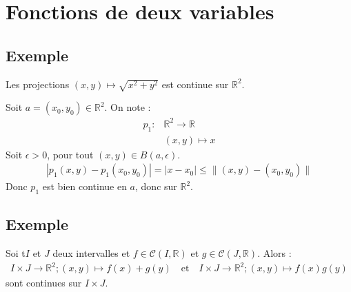 \documentclass[../main.tex]{subfiles}
\begin{document}
\setcounter{chapter}{35}
\chapter{Fonctions de deux variables}
\tableofcontents
\clearpage

\section{Exemple}
\begin{tcolorbox}[title=Exemple 36.15, title filled=false, colframe=darkgreen, colback=darkgreen!10!white]
    Les projections $(x, y)\mapsto \sqrt{x^2 + y^2}$ est continue sur $\mathbb{R}^2$. 
\end{tcolorbox}

\noindent Soit $a = (x_0, y_0)\in \mathbb{R}^2$. On note : 
\begin{align*}
    p_1:&\mathbb{R}^2\to \mathbb{R} \\
    &(x, y)\mapsto x
\end{align*}
Soit $\epsilon > 0$, pour tout $(x, y)\in B(a, \epsilon)$. 
\begin{align*}
    |p_1(x, y) - p_1(x_0, y_0)| = |x - x_0| \leq \| (x, y) - (x_0, y_0)\|
\end{align*}
Donc $p_1$ est bien continue en $a$, donc sur $\mathbb{R}^2$. 

\section{Exemple}
\begin{tcolorbox}[title=Exemple 36.17, title filled=false, colframe=darkgreen, colback=darkgreen!10!white]
    Soi t$I$ et $J$ deux intervalles et $f\in \mathcal{C}(I, \mathbb{R})$ et $g\in \mathcal{C}(J, \mathbb{R})$. Alors : 
    \begin{align*}
        I\times J\to \mathbb{R}^2; (x, y)\mapsto f(x) + g(y) \quad \text{et} \quad I\times J\to \mathbb{R}^2; (x, y)\mapsto f(x)g(y)
    \end{align*}
    sont continues sur $I\times J$. 
\end{tcolorbox}
\end{document}
